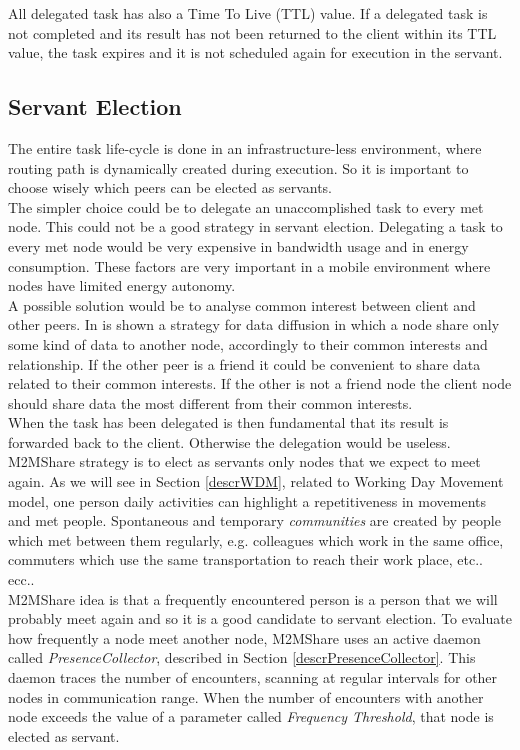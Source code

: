 All delegated task has also a Time To Live (TTL) value. If a delegated task is not completed and its result has not been returned to the client within its TTL value, the task expires and it is not scheduled again for execution in the servant.
\\

\subsection{Servant Election}
The entire task life-cycle is done in an infrastructure-less environment, where routing path is dynamically created during execution. So it is important to choose wisely which peers can be elected as servants.
\\

The simpler choice could be to delegate an unaccomplished task to every met node. This could not be a good strategy in servant election. Delegating a task to every met node would be very expensive in bandwidth usage and in energy consumption. These factors are very important in a mobile environment where nodes have limited energy autonomy. 
\\

A possible solution would be to analyse common interest between client and other peers. In \cite{socialNetworks} is shown a strategy for data diffusion in which a node share only some kind of data to another node, accordingly to their common interests and relationship. If the other peer is a friend it could be convenient to share data related to their common interests. If the other is not a friend node the client node should share data the most different from their common interests.
\\

When the task has been delegated is then fundamental that its result is forwarded back to the client. Otherwise the delegation would be useless. M2MShare strategy is to elect as servants only nodes that we expect to meet again. As we will see in Section \ref{descrWDM}, related to Working Day Movement model, one person daily activities can highlight a repetitiveness in movements and met people. Spontaneous and temporary \textit{communities} are created by people which met between them regularly, e.g. colleagues which work in the same office, commuters which use the same transportation to reach their work place, etc.. ecc..
\\

M2MShare idea is that a frequently encountered person is a person that we will probably meet again and so it is a good candidate to servant election. To evaluate how frequently a node meet another node, M2MShare uses an active daemon called \textit{PresenceCollector}, described in Section \ref{descrPresenceCollector}. This daemon traces the number of encounters, scanning at regular intervals for other nodes in communication range. When the number of encounters with another node exceeds the value of a parameter called \textit{Frequency Threshold}, that node is elected as servant.
\\

